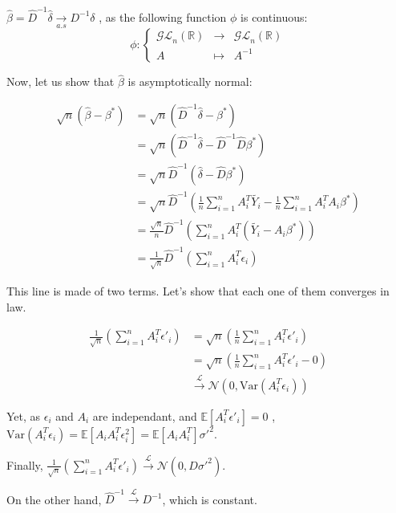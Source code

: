 $ \hat{\beta} = \hat{D}^{-1} \hat{\delta}  \underset{a.s}{\rightarrow}  D^{-1} \delta $ , as the following function $\phi$ is continuous:
\[
\phi: \left\{
\begin{array}{rcl}
\mathcal{GL}_n(\mathbb{R}) & \to & \mathcal{GL}_n(\mathbb{R}) \\
A & \mapsto & A^{-1}
\end{array}
\right.
\]


Now, let us show that $\hat{\beta}$ is asymptotically normal: 

\begin{align*}
    \sqrt{n} ( \hat{\beta} - \beta ^* ) &= \sqrt{n} (\hat{D}^{-1} \hat{\delta} - \beta ^* ) \\
     &= \sqrt{n} (\hat{D}^{-1} \hat{\delta} - \hat{D}^{-1} \hat{D} \beta ^* ) \\
     &= \sqrt{n} \hat{D}^{-1} (\hat{\delta} -  \hat{D} \beta ^* )  \\
     &= \sqrt{n} \hat{D}^{-1} \left( \frac{1}{n} \sum_{i=1}^{n} A_i ^T \tilde{Y_i} - \frac{1}{n}  \sum_{i=1}^{n}  A_i ^T A_i \beta ^* \right)  \\
     &= \frac{\sqrt{n}}{n} \hat{D}^{-1} \left( \sum_{i=1}^{n} A_i ^T (\tilde{Y_i} -    A_i \beta ^* ) \right)   \\
     &= \frac{1}{\sqrt{n}}  \hat{D} ^{-1} \left( \sum_{i=1}^{n}  A_i ^T \epsilon _ i \right)  
\end{align*}

This line is made of two terms. Let's show that each one of them converges in law. 

\begin{align*}
    \frac{1}{\sqrt{n}} \left( \sum_{i=1}^{n}  A_i^T \epsilon'_i \right) &= \sqrt{n} \left( \frac{1}{n} \sum_{i=1}^{n}  A_i^T \epsilon'_i \right) \\
    &= \sqrt{n} \left( \frac{1}{n} \sum_{i=1}^{n}  A_i^T \epsilon'_i - 0 \right) \\
    &\xrightarrow{\mathcal{L}} \mathcal{N}(0, \text{Var}(A_i^T \epsilon_i) )
\end{align*}

Yet, as $\epsilon_i $ and $  A_i $ are independant, and $\mathbb{E} [ A_i^T \epsilon'_i] = 0 $ , $\text{Var}(A_i^T \epsilon_i) = \mathbb{E}[A_i A_i ^T \epsilon_i ^2 ] = \mathbb{E} [ A_i A_i ^T ] \sigma'^2$. 

Finally, $\frac{1}{\sqrt{n}} \left( \sum_{i=1}^{n}  A_i^T \epsilon'_i \right) \xrightarrow{\mathcal{L}} \mathcal{N}(0, D \sigma'^{2})$. 

On the other hand, $\hat{D}^{-1} \xrightarrow{\mathcal{L}} D^{-1} $, which is constant.

